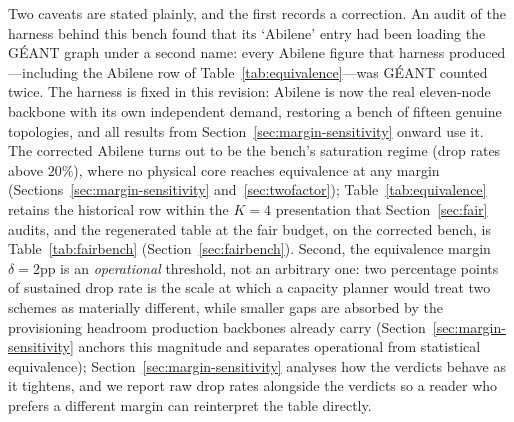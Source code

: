 Two caveats are stated plainly, and the first records a correction. An audit
of the harness behind this bench found that its `Abilene' entry had been
loading the G\'EANT graph under a second name: every Abilene figure that
harness produced---including the Abilene row of
Table~\ref{tab:equivalence}---was G\'EANT counted twice. The harness is fixed
in this revision: Abilene is now the real eleven-node backbone with its own
independent demand, restoring a bench of fifteen genuine topologies, and all
results from Section~\ref{sec:margin-sensitivity} onward use it. The corrected
Abilene turns out to be the bench's saturation regime (drop rates above
$20\%$), where no physical core reaches equivalence at any margin
(Sections~\ref{sec:margin-sensitivity} and~\ref{sec:twofactor});
Table~\ref{tab:equivalence} retains the historical row within the $K{=}4$
presentation that Section~\ref{sec:fair} audits, and the regenerated table at the fair
budget, on the corrected bench, is Table~\ref{tab:fairbench}
(Section~\ref{sec:fairbench}).
Second, the equivalence margin $\delta=2$pp is an \emph{operational} threshold, not an arbitrary one: two percentage points of sustained drop rate is the scale at which a capacity planner would treat two schemes as materially different, while smaller gaps are absorbed by the provisioning headroom production backbones already carry (Section~\ref{sec:margin-sensitivity} anchors this magnitude and separates operational from statistical equivalence);
Section~\ref{sec:margin-sensitivity} analyses how the verdicts behave as it
tightens, and we report raw drop rates alongside the verdicts so a reader who
prefers a different margin can reinterpret the table directly.
